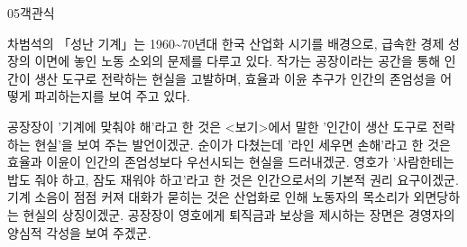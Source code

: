 \documentclass[fs85,seriesWit]{korfarm-base}
\begin{document}
\begin{kfQBlock}{05}{객관식}
\begin{kfEvidence}차범석의 「성난 기계」는 1960\textasciitilde{}70년대 한국 산업화 시기를 배경으로, 급속한 경제 성장의 이면에 놓인 노동 소외의 문제를 다루고 있다. 작가는 공장이라는 공간을 통해 인간이 생산 도구로 전락하는 현실을 고발하며, 효율과 이윤 추구가 인간의 존엄성을 어떻게 파괴하는지를 보여 주고 있다.\end{kfEvidence}
\begin{kfChoices}
\kfChoice 공장장이 '기계에 맞춰야 해'라고 한 것은 <보기>에서 말한 '인간이 생산 도구로 전락하는 현실'을 보여 주는 발언이겠군.
\kfChoice 순이가 다쳤는데 '라인 세우면 손해'라고 한 것은 효율과 이윤이 인간의 존엄성보다 우선시되는 현실을 드러내겠군.
\kfChoice 영호가 '사람한테는 밥도 줘야 하고, 잠도 재워야 하고'라고 한 것은 인간으로서의 기본적 권리 요구이겠군.
\kfChoice 기계 소음이 점점 커져 대화가 묻히는 것은 산업화로 인해 노동자의 목소리가 외면당하는 현실의 상징이겠군.
\kfChoice 공장장이 영호에게 퇴직금과 보상을 제시하는 장면은 경영자의 양심적 각성을 보여 주겠군.
\end{kfChoices}
\end{kfQBlock}

\kfEndMC
\end{document}

